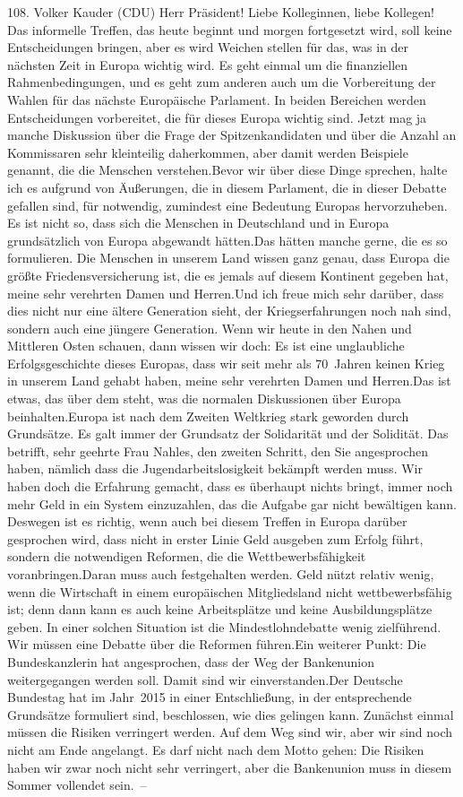 \documentclass{article}
\begin{document}
	108. Volker Kauder (CDU) Herr Präsident! Liebe Kolleginnen, liebe Kollegen! Das informelle Treffen, das heute beginnt und morgen fortgesetzt wird, soll keine Entscheidungen bringen, aber es wird Weichen stellen für das, was in der nächsten Zeit in Europa wichtig wird. Es geht einmal um die finanziellen Rahmenbedingungen, und es geht zum anderen auch um die Vorbereitung der Wahlen für das nächste Europäische Parlament. In beiden Bereichen werden Entscheidungen vorbereitet, die für dieses Europa wichtig sind. Jetzt mag ja manche Diskussion über die Frage der Spitzenkandidaten und über die Anzahl an Kommissaren sehr kleinteilig daherkommen, aber damit werden Beispiele genannt, die die Menschen verstehen.Bevor wir über diese Dinge sprechen, halte ich es aufgrund von Äußerungen, die in diesem Parlament, die in dieser Debatte gefallen sind, für notwendig, zumindest eine Bedeutung Europas hervorzuheben. Es ist nicht so, dass sich die Menschen in Deutschland und in Europa grundsätzlich von Europa abgewandt hätten.Das hätten manche gerne, die es so formulieren. Die Menschen in unserem Land wissen ganz genau, dass Europa die größte Friedensversicherung ist, die es jemals auf diesem Kontinent gegeben hat, meine sehr verehrten Damen und Herren.Und ich freue mich sehr darüber, dass dies nicht nur eine ältere Generation sieht, der Kriegserfahrungen noch nah sind, sondern auch eine jüngere Generation. Wenn wir heute in den Nahen und Mittleren Osten schauen, dann wissen wir doch: Es ist eine unglaubliche Erfolgsgeschichte dieses Europas, dass wir seit mehr als 70 Jahren keinen Krieg in unserem Land gehabt haben, meine sehr verehrten Damen und Herren.Das ist etwas, das über dem steht, was die normalen Diskussionen über Europa beinhalten.Europa ist nach dem Zweiten Weltkrieg stark geworden durch Grundsätze. Es galt immer der Grundsatz der Solidarität und der Solidität. Das betrifft, sehr geehrte Frau Nahles, den zweiten Schritt, den Sie angesprochen haben, nämlich dass die Jugendarbeitslosigkeit bekämpft werden muss. Wir haben doch die Erfahrung gemacht, dass es überhaupt nichts bringt, immer noch mehr Geld in ein System einzuzahlen, das die Aufgabe gar nicht bewältigen kann. Deswegen ist es richtig, wenn auch bei diesem Treffen in Europa darüber gesprochen wird, dass nicht in erster Linie Geld ausgeben zum Erfolg führt, sondern die notwendigen Reformen, die die Wettbewerbsfähigkeit voranbringen.Daran muss auch festgehalten werden. Geld nützt relativ wenig, wenn die Wirtschaft in einem europäischen Mitgliedsland nicht wettbewerbsfähig ist; denn dann kann es auch keine Arbeitsplätze und keine Ausbildungsplätze geben. In einer solchen Situation ist die Mindestlohndebatte wenig zielführend. Wir müssen eine Debatte über die Reformen führen.Ein weiterer Punkt: Die Bundeskanzlerin hat angesprochen, dass der Weg der Bankenunion weitergegangen werden soll. Damit sind wir einverstanden.Der Deutsche Bundestag hat im Jahr 2015 in einer Entschließung, in der entsprechende Grundsätze formuliert sind, beschlossen, wie dies gelingen kann. Zunächst einmal müssen die Risiken verringert werden. Auf dem Weg sind wir, aber wir sind noch nicht am Ende angelangt. Es darf nicht nach dem Motto gehen: Die Risiken haben wir zwar noch nicht sehr verringert, aber die Bankenunion muss in diesem Sommer vollendet sein. – 
\end{document}
